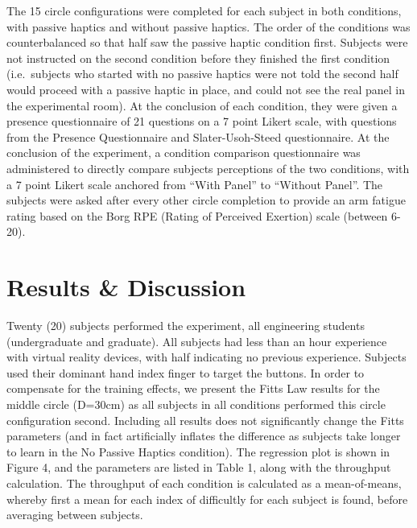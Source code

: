\documentclass[]{aiaa-tc}%
\begin{document}
The 15 circle configurations were completed for each subject in both conditions, with passive haptics and without passive haptics.
The order of the conditions was counterbalanced so that half saw the passive haptic condition first.
Subjects were not instructed on the second condition before they finished the first condition (i.e.\ subjects who started with no passive haptics were not told the second half would proceed with a passive haptic in place, and could not see the real panel in the experimental room).
At the conclusion of each condition, they were given a presence questionnaire of 21 questions on a 7 point Likert scale, with questions from the Presence Questionnaire and Slater-Usoh-Steed questionnaire.
At the conclusion of the experiment, a condition comparison questionnaire was administered to directly compare subjects perceptions of the two conditions, with a 7 point Likert scale anchored from ``With Panel'' to ``Without Panel''.
The subjects were asked after every other circle completion to provide an arm fatigue rating based on the Borg RPE (Rating of Perceived Exertion) scale (between 6-20).

\section{Results \& Discussion}
Twenty (20) subjects performed the experiment, all engineering students (undergraduate and graduate).
All subjects had less than an hour experience with virtual reality devices, with half indicating no previous experience.
Subjects used their dominant hand index finger to target the buttons.
In order to compensate for the training effects, we present the Fitts Law results for the middle circle (D=30cm) as all subjects in all conditions performed this circle configuration second.
Including all results does not significantly change the Fitts parameters (and in fact artificially inflates the difference as subjects take longer to learn in the No Passive Haptics condition).
The regression plot is shown in Figure 4, and the parameters are listed in Table 1, along with the throughput calculation.
The throughput of each condition is calculated as a mean-of-means, whereby first a mean for each index of difficultly for each subject is found, before averaging between subjects.
\end{document}
